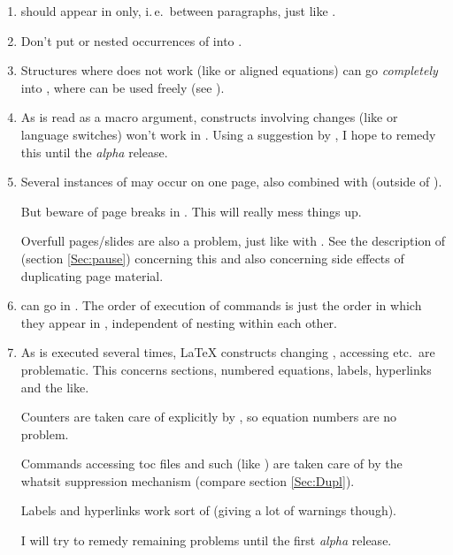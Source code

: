   \begin{enumerate}
  \item {} should appear in  only, i.\,e.\ between paragraphs, just like
    .

  \item Don't put  or nested occurrences of  into .
    
  \item Structures where  does not work (like  or aligned equations) can go
    \emph{completely} into , where  can be used freely (see ).
    
  \item As  is read as a macro argument, constructs involving  changes (like
     or language switches) won't work in . Using a suggestion by , I hope to remedy this until the \emph{alpha} release.

\newslide

  \item Several instances of  may occur on one page, also combined with  (outside
    of ).
    
    But beware of page breaks in . This will really mess things up. 
    
    Overfull pages/slides are also a problem, just like with . See the description of 
    (section \ref{Sec:pause}) concerning this and also concerning side effects of duplicating page material.

  \item {} can go in . The order of execution of  commands is just the
    order in which they appear in , independent of nesting within each other.
    
    \newslide
    
  \item As  is executed several times, \LaTeX{} constructs changing , accessing
     etc.\ are problematic. This concerns sections, numbered equations, labels, hyperlinks and the like.
    
    Counters are taken care of explicitly by , so equation numbers are no problem. 

    Commands accessing toc files and such (like ) are taken care of by the whatsit suppression
    mechanism (compare section \ref{Sec:Dupl}).

    Labels and hyperlinks work sort of (giving a lot of warnings though).

    I will try to remedy remaining problems until the first \emph{alpha} release.
  \end{enumerate}

